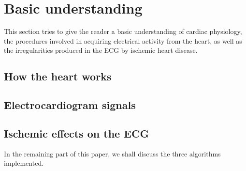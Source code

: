 
\section{Basic understanding}
\label{sec:section1}

This section tries to give the reader a basic understanding of cardiac physiology, the procedures involved in acquiring electrical activity from the heart, as well as the irregularities produced in the ECG by ischemic heart disease.

\subsection{How the heart works}

\subsection{Electrocardiogram signals}

\subsection{Ischemic effects on the ECG}


In the remaining part of this paper, we shall discuss the three algorithms implemented.
